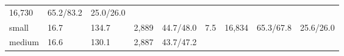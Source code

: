 \documentclass[
  9pt, a4paper, landscape]{article}
\begin{document}
\begin{longtable}[]{@{}lllllllll@{}}
\begin{minipage}[t]{0.08\columnwidth}
16,730\strut
\end{minipage} & \begin{minipage}[t]{0.08\columnwidth}\raggedright
65.2/83.2\strut
\end{minipage} & \begin{minipage}[t]{0.08\columnwidth}\raggedright
25.0/26.0\strut
\end{minipage}\tabularnewline
\begin{minipage}[t]{0.08\columnwidth}\raggedright
small\strut
\end{minipage} & \begin{minipage}[t]{0.08\columnwidth}\raggedright
16.7\strut
\end{minipage} & \begin{minipage}[t]{0.08\columnwidth}\raggedright
134.7\strut
\end{minipage} & \begin{minipage}[t]{0.08\columnwidth}\raggedright
2,889\strut
\end{minipage} & \begin{minipage}[t]{0.08\columnwidth}\raggedright
44.7/48.0\strut
\end{minipage} & \begin{minipage}[t]{0.08\columnwidth}\raggedright
7.5\strut
\end{minipage} & \begin{minipage}[t]{0.08\columnwidth}\raggedright
16,834\strut
\end{minipage} & \begin{minipage}[t]{0.08\columnwidth}\raggedright
65.3/67.8\strut
\end{minipage} & \begin{minipage}[t]{0.08\columnwidth}\raggedright
25.6/26.0\strut
\end{minipage}\tabularnewline
\begin{minipage}[t]{0.08\columnwidth}\raggedright
medium\strut
\end{minipage} & \begin{minipage}[t]{0.08\columnwidth}\raggedright
16.6\strut
\end{minipage} & \begin{minipage}[t]{0.08\columnwidth}\raggedright
130.1\strut
\end{minipage} & \begin{minipage}[t]{0.08\columnwidth}\raggedright
2,887\strut
\end{minipage} & \begin{minipage}[t]{0.08\columnwidth}\raggedright
43.7/47.2\strut

\end{minipage}
\end{longtable}
\end{document}
